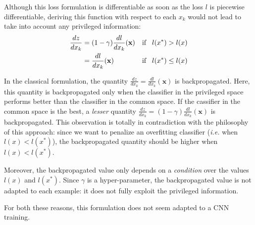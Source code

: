 {\color{red}Although this loss formulation is differentiable as soon as the loss $l$ is piecewise differentiable, deriving this function with respect to each $x_k$ would not lead to take into account any privileged information: 
\begin{align}
 \frac{dz}{dx_k} &= (1-\gamma) \frac{dl}{dx_k}(\mathbf{x})  &  \text{if}& \hspace{0.3cm} l(x^*) > l(x) \nonumber \\
                 &= \frac{dl}{dx_k}(\mathbf{x})             &  \text{if}& \hspace{0.3cm} l(x^*) \leq l(x) \nonumber
\end{align}

In the classical formulation, the quantity $\frac{dz}{dx_k} = \frac{dl}{dx_k}(\mathbf{x})$ is backpropagated.
Here, this quantity is backpropagated only when the classifier in the privileged space performs better than the classifier in the common space. 
If the cassifier in the common space is the best, a \textit{lesser} quantity $\frac{dz}{dx_k} = (1-\gamma) \frac{dl}{dx_k}(\mathbf{x})$ is backpropagated.
This observation is totally in contradiction with the philosophy of this approach: since we want to penalize an overfitting classifier (\textit{i.e.} when $l(x) < l(x^*)$), the backpropagated quantity should be higher when $l(x) < l(x^*)$.

Moreover, the backpropagated value only depends on a \textit{condition} over the values $l(x)$ and $l(x^*)$. Since $\gamma$ is a hyper-parameter, the backpropagated value is not adapted to each example: it does not fully exploit the privileged information. 

For both these reasons, this formulation does not seem adapted to a CNN training. 
}